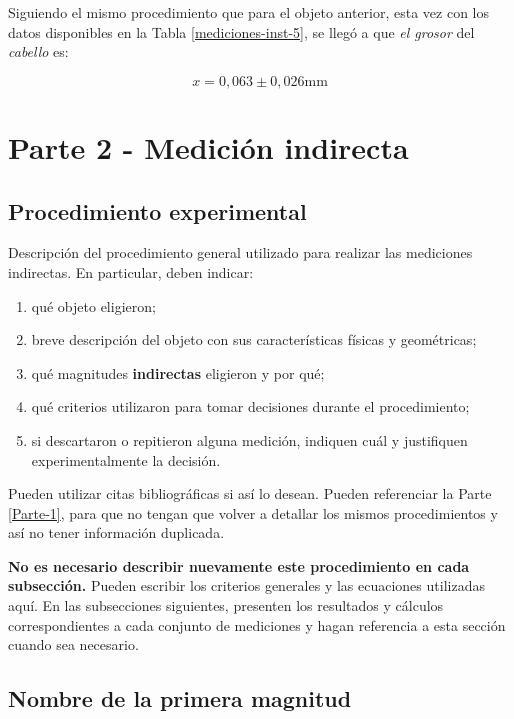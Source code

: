 \documentclass[12pt,a4paper]{article}
\begin{document}
Siguiendo el mismo procedimiento que para el objeto anterior, esta vez con los datos disponibles en la Tabla \ref{mediciones-inst-5}, se llegó a que \textit{el grosor} del \textit{cabello} es:

\begin{equation*}
x = 0,063 \pm 0,026 \textrm{mm}
\end{equation*}

\newpage

\section{Parte 2 - Medición indirecta} \label{Parte-2}

\subsection{Procedimiento experimental}

Descripción del procedimiento general utilizado para realizar las mediciones indirectas. En particular, deben indicar:

\begin{enumerate}[label=\alph*)]
    \item qué objeto eligieron;
    \item breve descripción del objeto con sus características físicas y geométricas;
    \item qué magnitudes \textbf{indirectas} eligieron y por qué;
    \item qué criterios utilizaron para tomar decisiones durante el procedimiento;
    \item si descartaron o repitieron alguna medición, indiquen cuál y justifiquen experimentalmente la decisión.
\end{enumerate}

Pueden utilizar citas bibliográficas si así lo desean. Pueden referenciar la Parte \ref{Parte-1}, para que no tengan que volver a detallar los mismos procedimientos y así no tener información duplicada.

\textbf{No es necesario describir nuevamente este procedimiento en cada subsección.} Pueden escribir los criterios generales y las ecuaciones utilizadas aquí. En las subsecciones siguientes, presenten los resultados y cálculos correspondientes a cada conjunto de mediciones y hagan referencia a esta sección cuando sea necesario.

\subsection{Nombre de la primera magnitud}
\end{document}
